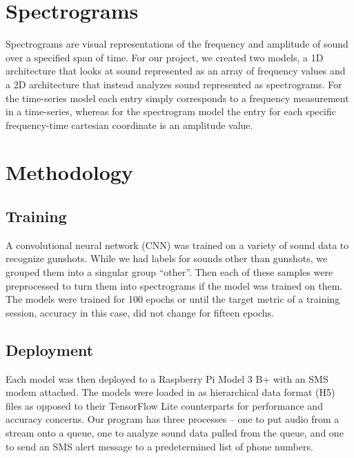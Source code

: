\documentclass[conference]{IEEEtran}
\begin{document}
\begin{figure}[h!]
    \begin{flushleft}
        \texttt{[image: \{"2D CNN Architecture"]}.png}
        \caption{An illustration of our 2D CNN's architecture.}
        \label{fig:illustration1}
    \end{flushleft}
\end{figure}

\section{Spectrograms}
Spectrograms are visual representations of the frequency and amplitude of sound over a specified span of time. For our project, we created two models, a 1D architecture that looks at sound represented as an array of frequency values and a 2D architecture that instead analyzes sound represented as spectrograms. For the time-series model each entry simply corresponds to a frequency measurement in a time-series, whereas for the spectrogram model the entry for each specific frequency-time cartesian coordinate is an amplitude value.

\section{Methodology}
\subsection{Training}

A convolutional neural network (CNN) was trained on a variety of sound data to recognize gunshots. While we had labels for sounds other than gunshots, we grouped them into a singular group “other”. Then each of these samples were preprocessed to turn them into spectrograms if the model was trained on them. The models were trained for 100 epochs or until the target metric of a training session, accuracy in this case, did not change for fifteen epochs.

\subsection{Deployment}
Each model was then deployed to a Raspberry Pi Model 3 B+ with an SMS modem attached. The models were loaded in as hierarchical data format (H5) files as opposed to their TensorFlow Lite counterparts for performance and accuracy concerns. Our program has three processes – one to put audio from a stream onto a queue, one to analyze sound data pulled from the queue, and one to send an SMS alert message to a predetermined list of phone numbers.
\end{document}
